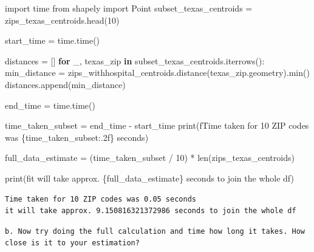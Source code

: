 \documentclass[
  letterpaper,
  DIV=11,
  numbers=noendperiod]{scrartcl}
\newenvironment{Shaded}{\begin{snugshade}}{\end{snugshade}}
\newcommand{\BuiltInTok}[1]{\textcolor[rgb]{0.00,0.23,0.31}{#1}}
\newcommand{\ControlFlowTok}[1]{\textcolor[rgb]{0.00,0.23,0.31}{\textbf{#1}}}
\newcommand{\DecValTok}[1]{\textcolor[rgb]{0.68,0.00,0.00}{#1}}
\newcommand{\ImportTok}[1]{\textcolor[rgb]{0.00,0.46,0.62}{#1}}
\newcommand{\KeywordTok}[1]{\textcolor[rgb]{0.00,0.23,0.31}{\textbf{#1}}}
\newcommand{\NormalTok}[1]{\textcolor[rgb]{0.00,0.23,0.31}{#1}}
\newcommand{\OperatorTok}[1]{\textcolor[rgb]{0.37,0.37,0.37}{#1}}
\newcommand{\SpecialCharTok}[1]{\textcolor[rgb]{0.37,0.37,0.37}{#1}}
\newcommand{\SpecialStringTok}[1]{\textcolor[rgb]{0.13,0.47,0.30}{#1}}
\begin{document}
\begin{Shaded}
\begin{Highlighting}[]
\ImportTok{import}\NormalTok{ time}
\ImportTok{from}\NormalTok{ shapely }\ImportTok{import}\NormalTok{ Point}
\NormalTok{subset\_texas\_centroids }\OperatorTok{=}\NormalTok{ zips\_texas\_centroids.head(}\DecValTok{10}\NormalTok{)}

\NormalTok{start\_time }\OperatorTok{=}\NormalTok{ time.time()}

\NormalTok{distances }\OperatorTok{=}\NormalTok{ []}
\ControlFlowTok{for}\NormalTok{ \_, texas\_zip }\KeywordTok{in}\NormalTok{ subset\_texas\_centroids.iterrows():}
\NormalTok{    min\_distance }\OperatorTok{=}\NormalTok{ zips\_withhospital\_centroids.distance(texas\_zip.geometry).}\BuiltInTok{min}\NormalTok{()}
\NormalTok{    distances.append(min\_distance)}


\NormalTok{end\_time }\OperatorTok{=}\NormalTok{ time.time()}

\NormalTok{time\_taken\_subset }\OperatorTok{=}\NormalTok{ end\_time }\OperatorTok{{-}}\NormalTok{ start\_time}
\BuiltInTok{print}\NormalTok{(}\SpecialStringTok{f\textquotesingle{}Time taken for 10 ZIP codes was }\SpecialCharTok{\{}\NormalTok{time\_taken\_subset}\SpecialCharTok{:.2f\}}\SpecialStringTok{ seconds\textquotesingle{}}\NormalTok{)}

\NormalTok{full\_data\_estimate }\OperatorTok{=}\NormalTok{ (time\_taken\_subset }\OperatorTok{/} \DecValTok{10}\NormalTok{) }\OperatorTok{*} \BuiltInTok{len}\NormalTok{(zips\_texas\_centroids)}

\BuiltInTok{print}\NormalTok{(}\SpecialStringTok{f\textquotesingle{}it will take approx. }\SpecialCharTok{\{}\NormalTok{full\_data\_estimate}\SpecialCharTok{\}}\SpecialStringTok{ seconds to join the whole df\textquotesingle{}}\NormalTok{)}
\end{Highlighting}
\end{Shaded}

\begin{verbatim}
Time taken for 10 ZIP codes was 0.05 seconds
it will take approx. 9.150816321372986 seconds to join the whole df
\end{verbatim}

\begin{verbatim}
b. Now try doing the full calculation and time how long it takes. How close is it to your estimation?
\end{verbatim}
\end{document}
